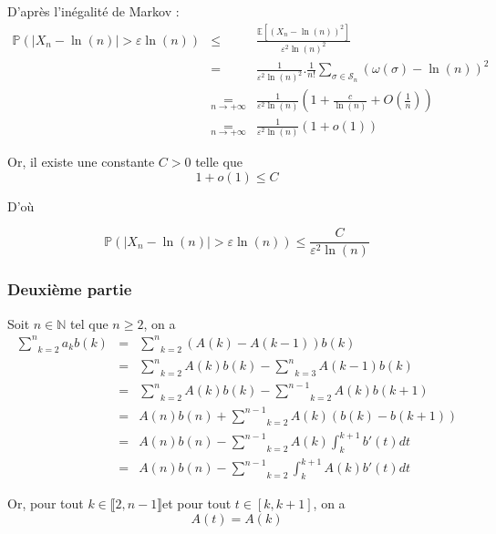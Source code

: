  D'apr{\`e}s l'in{\'e}galit{\'e} de Markov :
\begin{eqnarray*}
  \mathbb{P} (| X_n - \ln (n) | > \varepsilon \ln (n)) & \leqslant &
  \frac{\mathbb{E} [(X_n - \ln (n))^2]}{\varepsilon^2 \ln (n)^2}\\
  & = & \frac{1}{\varepsilon^2 \ln (n)^2} . \frac{1}{n!} \underset{\sigma \in
  \mathcal{S}_n}{\sum} (\omega (\sigma) - \ln (n))^2\\
  & \underset{n \rightarrow + \infty}{=} & \frac{1}{\varepsilon^2 \ln (n)}
  \left( 1 + \frac{c}{\ln (n)} + O \left( \frac{1}{n} \right) \right)\\
  & \underset{n \rightarrow + \infty}{=} & \frac{1}{\varepsilon^2 \ln (n)} (1
  + o (1))
\end{eqnarray*}


Or, il existe une constante $C > 0$ telle que
\[ 1 + o (1) \leqslant C \]


D'o{\`u}


\[ \mathbb{P} (| X_n - \ln (n) | > \varepsilon \ln (n)) \leqslant
   \frac{C}{\varepsilon^2 \ln (n)} \]

\subsubsection*{\centering Deuxième partie}


 Soit $n \in \mathbb{N}$ tel que $n \geqslant 2$, on a
\begin{eqnarray*}
  \underset{k = 2}{\overset{n}{\sum}} a_k b (k) & = & \underset{k =
  2}{\overset{n}{\sum}} (A (k) - A (k - 1)) b (k)\\
  & = & \underset{k = 2}{\overset{n}{\sum}} A (k) b (k) - \underset{k =
  3}{\overset{n}{\sum}} A (k - 1) b (k)\\
  & = & \underset{k = 2}{\overset{n}{\sum}} A (k) b (k) - \underset{k =
  2}{\overset{n - 1}{\sum}} A (k) b (k + 1)\\
  & = & A (n) b (n) + \underset{k = 2}{\overset{n - 1}{\sum}} A (k) (b (k) -
  b (k + 1))\\
  & = & A (n) b (n) - \underset{k = 2}{\overset{n - 1}{\sum}} A (k) \int^{k +
  1}_k b' (t) d t\\
  & = & A (n) b (n) - \underset{k = 2}{\overset{n - 1}{\sum}} \int^{k + 1}_k
  A (k) b' (t) d t
\end{eqnarray*}


Or, pour tout $k \in \llbracket 2, n - 1 \rrbracket $et pour tout $t \in [k, k
+ 1]$, on a
\[ A (t) = A (k) \]


